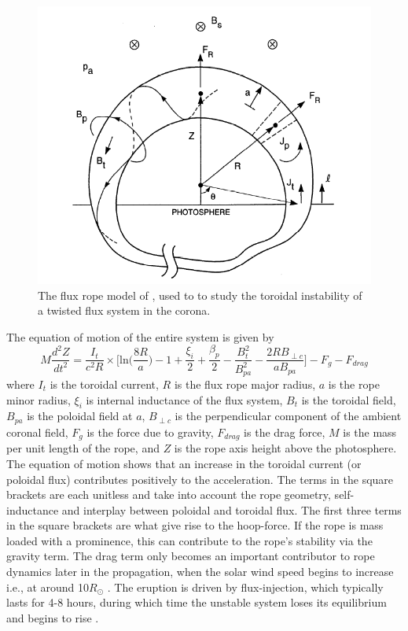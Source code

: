 \begin{figure}[!t]
\begin{center}
\includegraphics[scale=0.4, trim=0cm 1cm 0cm 1cm]{images/chen_model}
\caption[The toroidal instability CME model]{The flux rope model of \citet{chen1989}, used to to study the toroidal instability of a twisted flux system in the corona.}
\label{fig:chen_model}
\end{center}
\end{figure}
The equation of motion of the entire system is given by
\begin{equation}
M\frac{d^2Z}{dt^2} = \frac{I_t}{c^2R}\times\bigg[ \mathrm{ln}\bigg(\frac{8R}{a}\bigg) -1+ \frac{\xi_i}{2} + \frac{\beta_p}{2} -\frac{B^2_t}{B^2_{pa}}  -\frac{2RB_{\perp c}}{aB_{pa}} \bigg] - F_g - F_{drag}
\end{equation}
where $I_t$ is the toroidal current, $R$ is the flux rope major radius, $a$ is the rope minor radius, $\xi_i$ is internal inductance of the flux system, $B_t$ is the toroidal field, $B_{pa}$ is the poloidal field at $a$, $B_{\perp c}$ is the perpendicular component of the ambient coronal field, $F_g$ is the force due to gravity, $F_{drag}$ is the drag force, $M$ is the mass per unit length of the rope, and $Z$ is the rope axis height above the photosphere. The equation of motion shows that an increase in the toroidal current (or poloidal flux) contributes positively to the acceleration. The terms in the square brackets are each unitless and take into account the rope geometry, self-inductance and interplay between poloidal and toroidal flux. The first three terms in the square brackets are what give rise to the hoop-force. If the rope is mass loaded with a prominence, this can contribute to the rope's stability via the gravity term. The drag term only becomes an important contributor to rope dynamics later in the propagation, when the solar wind speed begins to increase i.e., at around 10$R_{\odot}$ \citep{sheeley1997}. The eruption is driven by flux-injection, which typically lasts for 4-8 hours, during which time the unstable system loses its equilibrium and begins to rise \citet{krall2001}.

